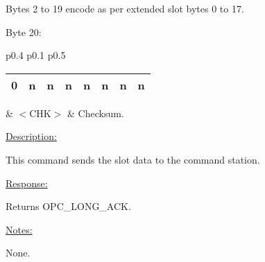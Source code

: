 Bytes 2 to 19 encode as per extended slot bytes 0 to 17.

Byte 20:

\begin{tabular}{p{0.4\linewidth} p{0.1\linewidth} p{0.5\linewidth}} 

\begin{tabular}{|p{0.3cm}|p{0.3cm}|p{0.3cm}|p{0.3cm}|p{0.3cm}|p{0.3cm}|p{0.3cm}|p{0.3cm}|}
\hline
0 & n & n & n & n & n & n & n\\
\hline
\end{tabular}
& $<$CHK$>$ & Checksum.\\
\end{tabular}

\underline{Description:}

This command sends the slot data to the command station.

\underline{Response:} 

Returns OPC\_LONG\_ACK.

\underline{Notes:} 

None.

